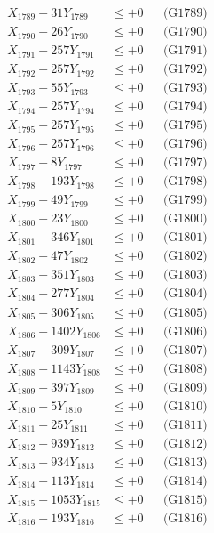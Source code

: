 \documentclass[a4paper,10pt]{article}
\begin{document}
{\begin{align}
X_{1789} - 31Y_{1789} &\leq +0 && \text{(G1789)} \\
X_{1790} - 26Y_{1790} &\leq +0 && \text{(G1790)} \\
\allowbreak
X_{1791} - 257Y_{1791} &\leq +0 && \text{(G1791)} \\
X_{1792} - 257Y_{1792} &\leq +0 && \text{(G1792)} \\
X_{1793} - 55Y_{1793} &\leq +0 && \text{(G1793)} \\
X_{1794} - 257Y_{1794} &\leq +0 && \text{(G1794)} \\
X_{1795} - 257Y_{1795} &\leq +0 && \text{(G1795)} \\
X_{1796} - 257Y_{1796} &\leq +0 && \text{(G1796)} \\
X_{1797} - 8Y_{1797} &\leq +0 && \text{(G1797)} \\
X_{1798} - 193Y_{1798} &\leq +0 && \text{(G1798)} \\
X_{1799} - 49Y_{1799} &\leq +0 && \text{(G1799)} \\
X_{1800} - 23Y_{1800} &\leq +0 && \text{(G1800)} \\
\allowbreak
X_{1801} - 346Y_{1801} &\leq +0 && \text{(G1801)} \\
X_{1802} - 47Y_{1802} &\leq +0 && \text{(G1802)} \\
X_{1803} - 351Y_{1803} &\leq +0 && \text{(G1803)} \\
X_{1804} - 277Y_{1804} &\leq +0 && \text{(G1804)} \\
X_{1805} - 306Y_{1805} &\leq +0 && \text{(G1805)} \\
X_{1806} - 1402Y_{1806} &\leq +0 && \text{(G1806)} \\
X_{1807} - 309Y_{1807} &\leq +0 && \text{(G1807)} \\
X_{1808} - 1143Y_{1808} &\leq +0 && \text{(G1808)} \\
X_{1809} - 397Y_{1809} &\leq +0 && \text{(G1809)} \\
X_{1810} - 5Y_{1810} &\leq +0 && \text{(G1810)} \\
\allowbreak
X_{1811} - 25Y_{1811} &\leq +0 && \text{(G1811)} \\
X_{1812} - 939Y_{1812} &\leq +0 && \text{(G1812)} \\
X_{1813} - 934Y_{1813} &\leq +0 && \text{(G1813)} \\
X_{1814} - 113Y_{1814} &\leq +0 && \text{(G1814)} \\
X_{1815} - 1053Y_{1815} &\leq +0 && \text{(G1815)} \\
X_{1816} - 193Y_{1816} &\leq +0 && \text{(G1816)} \\

\end{align}}
\end{document}
